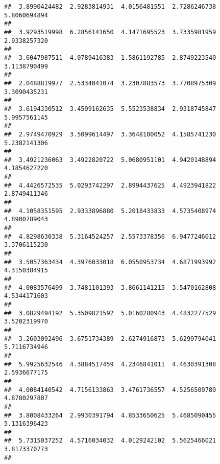 \documentclass[]{article}
\begin{document}
\begin{verbatim}
##  3.8990424482  2.9283814931  4.0156481551  2.7286246738  5.8060694894 
##                                                                       
##  3.9293519998  6.2856141650  4.1471695523  3.7335981959  2.9338257320 
##                                                                       
##  3.6047987511  4.0789416383  1.5861192785  2.8749223540  3.1138790499 
##                                                                       
##  2.0488819977  2.5334041074  3.2307883573  3.7708975309  3.3090435231 
##                                                                       
##  3.6194330512  3.4599162635  5.5523538834  2.9318745847  5.9957561145 
##                                                                       
##  2.9749470929  3.5099614497  3.3648100052  4.1585741230  5.2382141306 
##                                                                       
##  3.4921236063  3.4922820722  5.0680951101  4.9420148894  4.1854627220 
##                                                                       
##  4.4426572535  5.0293742297  2.8994437625  4.4923941822  2.8749411346 
##                                                                       
##  4.1058351595  2.9333896880  5.2018433833  4.5735408974  4.8900789043 
##                                                                       
##  4.8298630338  5.3164524257  2.5573378356  6.9477246012  3.3706115230 
##                                                                       
##  3.5057363434  4.3976033018  6.0550953734  4.6871993992  4.3150384915 
##                                                                       
##  4.0083576499  3.7481101393  3.8661141215  3.5470162808  4.5344171603 
##                                                                       
##  3.0829494192  5.3509821592  5.0160280943  4.4832277529  3.5202319970 
##                                                                       
##  3.2603092496  3.6751734389  2.6274916873  5.6299794041  5.7116734946 
##                                                                       
##  5.9925632546  4.3884517459  4.2346841011  4.4630391308  2.5936677175 
##                                                                       
##  4.0084140542  4.7156133863  3.4761736557  4.5256509780  4.8780297807 
##                                                                       
##  3.8008433264  2.9930391794  4.8533650625  5.4685090455  5.1316396423 
##                                                                       
##  5.7315037252  4.5716034032  4.0129242102  5.5625466021  3.8173370773 
##                                                                       

\end{verbatim}
\end{document}
